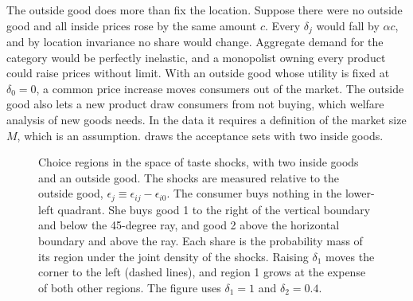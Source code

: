 The outside good does more than fix the location. Suppose there were no outside good and all inside
prices rose by the same amount $c$. Every $\delta_j$ would fall by $\alpha c$, and by location invariance no
share would change. Aggregate demand for the category would be perfectly inelastic, and a monopolist owning
every product could raise prices without limit. With an outside good whose utility is fixed at
$\delta_0 = 0$, a common price increase moves consumers out of the market. The outside good also lets a new
product draw consumers from not buying, which welfare analysis of new goods needs. In the data it requires
a definition of the market size $M$, which is an assumption.  draws the acceptance sets
with two inside goods.

\begin{figure}[htbp]
\centering
{}
\caption{Choice regions in the space of taste shocks, with two inside goods and an outside good. The shocks
are measured relative to the outside good, $\epsilon_j \equiv \epsilon_{ij} - \epsilon_{i0}$. The consumer buys nothing in
the lower-left quadrant. She buys good 1 to the right of the vertical boundary and below the 45-degree ray,
and good 2 above the horizontal boundary and above the ray. Each share is the probability mass of its region under the
joint density of the shocks. Raising $\delta_1$ moves the corner to the left (dashed lines), and region 1
grows at the expense of both other regions. The figure uses $\delta_1 = 1$ and $\delta_2 = 0.4$.}\label{fig:B-epsplane}
\end{figure}

